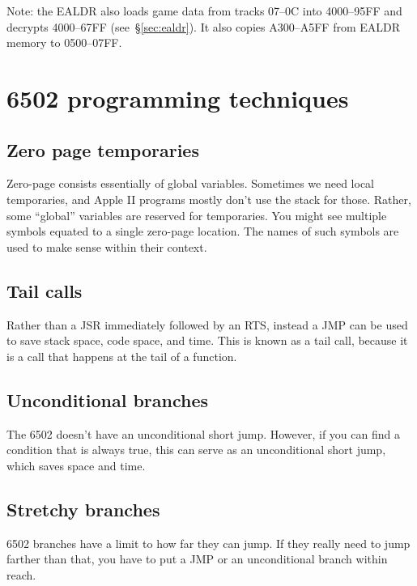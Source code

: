 \documentclass[10pt]{report}
\begin{document}
Note: the {\Tt{}EALDR\nwendquote} also loads game data from tracks {\Tt{}{\$}07\nwendquote}--{\Tt{}{\$}0C\nwendquote} into
{\Tt{}{\$}4000\nwendquote}--{\Tt{}{\$}95FF\nwendquote} and decrypts {\Tt{}{\$}4000\nwendquote}--{\Tt{}{\$}67FF\nwendquote} (see~\S\ref{sec:ealdr}).
It also copies {\Tt{}{\$}A300\nwendquote}--{\Tt{}{\$}A5FF\nwendquote} from {\Tt{}EALDR\nwendquote} memory to {\Tt{}{\$}0500\nwendquote}--{\Tt{}{\$}07FF\nwendquote}.

\chapter{6502 programming techniques}

\section{Zero page temporaries}

Zero-page consists essentially of global variables. Sometimes we need local
temporaries, and Apple II programs mostly don't use the stack for those. Rather,
some ``global'' variables are reserved for temporaries. You might see multiple
symbols equated to a single zero-page location. The names of such symbols are
used to make sense within their context.

\section{Tail calls}

Rather than a {\Tt{}JSR\nwendquote} immediately followed by an {\Tt{}RTS\nwendquote}, instead a {\Tt{}JMP\nwendquote}
can be used to save stack space, code space, and time. This is known as a
tail call, because it is a call that happens at the tail of a function.

\section{Unconditional branches}

The 6502 doesn't have an unconditional short jump. However, if you can find
a condition that is always true, this can serve as an unconditional short
jump, which saves space and time.

\section{Stretchy branches}

6502 branches have a limit to how far they can jump. If they really need to
jump farther than that, you have to put a {\Tt{}JMP\nwendquote} or an unconditional branch
within reach.
\end{document}
